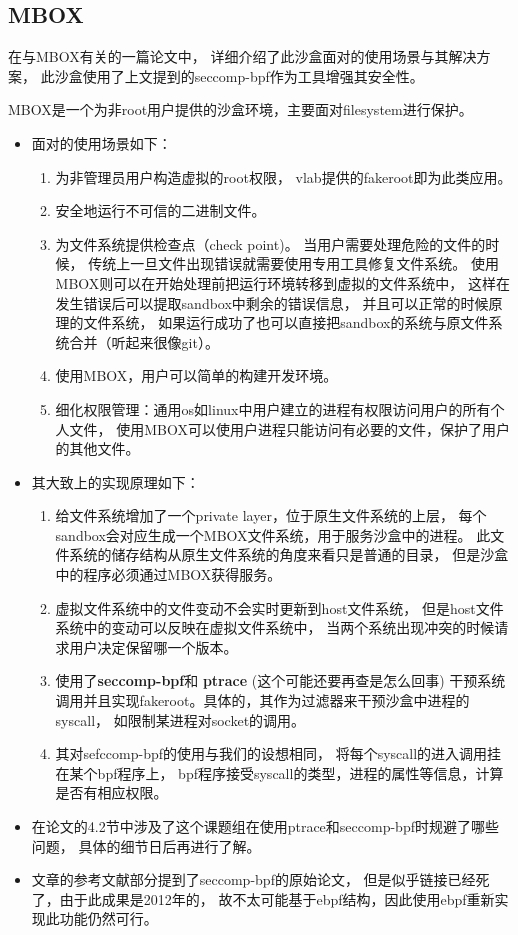 \documentclass[AutoFakeBold,a4paper]{ctexart}
\begin{document}
\subsection{MBOX}

在与MBOX有关的一篇论文\cite{180196}中，
详细介绍了此沙盒面对的使用场景与其解决方案，
此沙盒使用了上文提到的seccomp-bpf作为工具增强其安全性。

MBOX是一个为非root用户提供的沙盒环境，主要面对filesystem进行保护。

\begin{itemize}
    \item 面对的使用场景如下：
    \begin{enumerate}
        \item 为非管理员用户构造虚拟的root权限，
        vlab提供的fakeroot即为此类应用。
        \item 安全地运行不可信的二进制文件。
        \item 为文件系统提供检查点（check point)。
        当用户需要处理危险的文件的时候，
        传统上一旦文件出现错误就需要使用专用工具修复文件系统。
        使用MBOX则可以在开始处理前把运行环境转移到虚拟的文件系统中，
        这样在发生错误后可以提取sandbox中剩余的错误信息，
        并且可以正常的时候原理的文件系统，
        如果运行成功了也可以直接把sandbox的系统与原文件系统合并（听起来很像git）。
        \item 使用MBOX，用户可以简单的构建开发环境。
        \item 细化权限管理：通用os如linux中用户建立的进程有权限访问用户的所有个人文件，
        使用MBOX可以使用户进程只能访问有必要的文件，保护了用户的其他文件。
    \end{enumerate}
    \item 其大致上的实现原理如下：
    \begin{enumerate}
        \item 给文件系统增加了一个private layer，位于原生文件系统的上层，
        每个sandbox会对应生成一个MBOX文件系统，用于服务沙盒中的进程。
        此文件系统的储存结构从原生文件系统的角度来看只是普通的目录，
        但是沙盒中的程序必须通过MBOX获得服务。
        \item 虚拟文件系统中的文件变动不会实时更新到host文件系统，
        但是host文件系统中的变动可以反映在虚拟文件系统中，
        当两个系统出现冲突的时候请求用户决定保留哪一个版本。
        \item 使用了\textbf{seccomp-bpf}和
        \textbf{ptrace} (这个可能还要再查是怎么回事) 
        干预系统调用并且实现fakeroot。具体的，其作为过滤器来干预沙盒中进程的syscall，
        如限制某进程对socket的调用。
        \item 其对sefccomp-bpf的使用与我们的设想相同，
        将每个syscall的进入调用挂在某个bpf程序上，
        bpf程序接受syscall的类型，进程的属性等信息，计算是否有相应权限。
    \end{enumerate}
    \item 在论文的4.2节中涉及了这个课题组在使用ptrace和seccomp-bpf时规避了哪些问题，
    具体的细节日后再进行了解。
    \item 文章的参考文献部分提到了seccomp-bpf的原始论文\cite{DynSec}，
    但是似乎链接已经死了，由于此成果是2012年的，
    故不太可能基于ebpf结构，因此使用ebpf重新实现此功能仍然可行。
\end{itemize}
\end{document}
